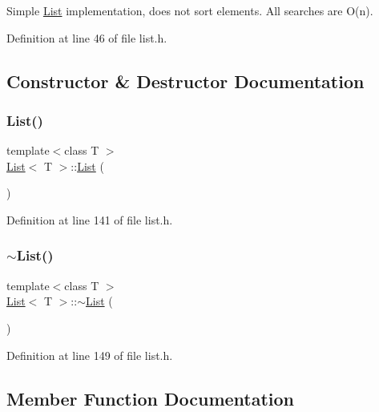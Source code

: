 Simple \hyperlink{classList}{List} implementation, does not sort elements. All searches are O(n). 

Definition at line 46 of file list.\+h.



\subsection{Constructor \& Destructor Documentation}
\mbox{\label{classList_a5c5e27671b21b3815d4e25b953c69454}} 
\subsubsection{\texorpdfstring{List()}{List()}}
{\footnotesize\ttfamily template$<$class T $>$ \\
\hyperlink{classList}{List}$<$ T $>$\+::\hyperlink{classList}{List} (\begin{DoxyParamCaption}{ }\end{DoxyParamCaption})}



Definition at line 141 of file list.\+h.

\mbox{\label{classList_a2b58189090f6e5ce52939c9195e59e85}} 
\subsubsection{\texorpdfstring{$\sim$\+List()}{~List()}}
{\footnotesize\ttfamily template$<$class T $>$ \\
\hyperlink{classList}{List}$<$ T $>$\+::$\sim$\hyperlink{classList}{List} (\begin{DoxyParamCaption}{ }\end{DoxyParamCaption})}



Definition at line 149 of file list.\+h.



\subsection{Member Function Documentation}
\mbox{\label{classList_a5800fe042063d0a91f74379809be48ff}} 
